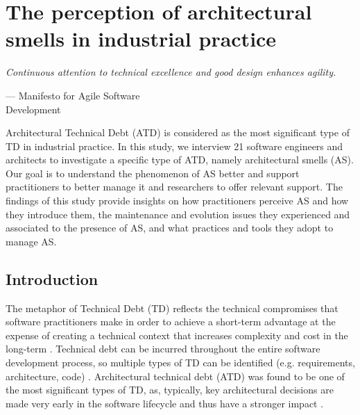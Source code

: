 \setlength{\headheight}{1.2cm}
\renewcommand{\publ}{\flushleft\footnotesize{Based on:\\[0.1cm]
		\textit{D. Sas, I. Pigazzini, P. Avgeriou and F. Arcelli F., "The Perception of Architectural Smells in Industrial Practice," in IEEE Software, vol. 38, no. 6, pp. 35-41, Nov.-Dec. 2021, doi: 10.1109/MS.2021.3103664.} \\[0.1cm]
}}

\chapter{The perception of architectural smells in industrial practice}
\label{chap:3}
\epigraph{\emph{Continuous attention to technical excellence
and good design enhances agility.}}{--- Manifesto for  Agile Software\\Development}


\begin{Abstract}
	Architectural Technical Debt (ATD) is considered as the most significant type of TD in industrial practice. In this study, we interview 21 software engineers and architects to investigate a specific type of ATD, namely architectural smells (AS). Our goal is to understand the phenomenon of AS better and support practitioners to better manage it and researchers to offer relevant support. The findings of this study provide insights on how practitioners perceive AS and how they introduce them, the maintenance and evolution issues they experienced and associated to the presence of AS, and what practices and tools they adopt to manage AS.
\end{Abstract}

\section{Introduction}\label{c3:introduction}
The metaphor of Technical Debt (TD) reflects the technical compromises that software practitioners make in order to achieve a short-term advantage at the expense of creating a technical context that increases complexity and cost in the long-term \cite{Avgeriou2016}.  
Technical debt can be incurred throughout the entire software development process, so multiple types of TD can be identified (e.g. requirements, architecture, code) \cite{Alves2016}. Architectural technical debt (ATD) was found to be one of the most significant types of TD, as, typically, key architectural decisions are made very early in the software lifecycle and thus have a stronger impact \cite{Ernst2015}.

